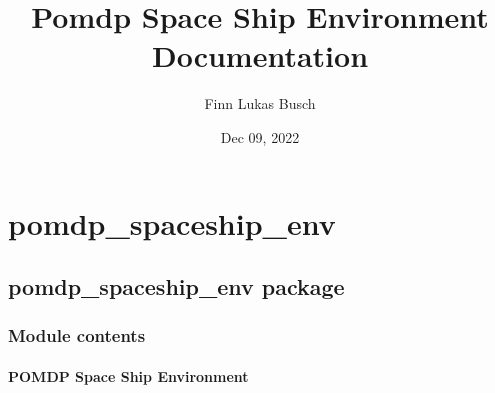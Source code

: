 \documentclass[letterpaper,10pt,english]{sphinxmanual}
\title{Pomdp Space Ship Environment Documentation}
\date{Dec 09, 2022}
\author{Finn Lukas Busch}
\begin{document}
\pagestyle{empty}
\sphinxmaketitle
\pagestyle{plain}
\sphinxtableofcontents
\pagestyle{normal}
\label{\detokenize{index::doc}}



\chapter{pomdp\_spaceship\_env}
\label{\detokenize{modules:pomdp-spaceship-env}}\label{\detokenize{modules::doc}}

\section{pomdp\_spaceship\_env package}
\label{\detokenize{pomdp_spaceship_env:pomdp-spaceship-env-package}}\label{\detokenize{pomdp_spaceship_env::doc}}

\subsection{Module contents}
\label{\detokenize{pomdp_spaceship_env:module-pomdp_spaceship_env}}\label{\detokenize{pomdp_spaceship_env:module-contents}}

\subsubsection{POMDP Space Ship Environment}
\label{\detokenize{pomdp_spaceship_env:pomdp-space-ship-environment}}
\end{document}

